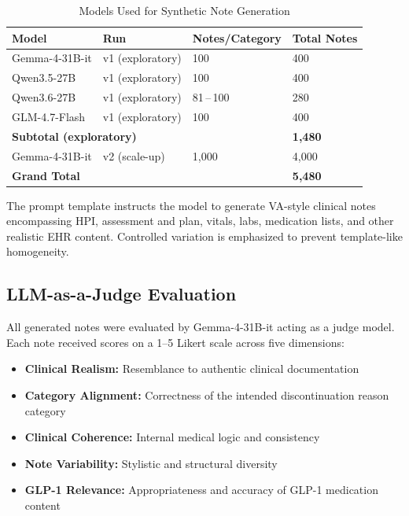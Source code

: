\documentclass[11pt, a4paper]{article}
\begin{document}
\begin{table}[H]
\centering
\caption{Models Used for Synthetic Note Generation}
\label{tab:generation_stats}
\begin{tabular}{llll}
\toprule
\textbf{Model} & \textbf{Run} & \textbf{Notes/Category} & \textbf{Total Notes} \\
\midrule
Gemma-4-31B-it & v1 (exploratory) & 100 & 400 \\
Qwen3.5-27B & v1 (exploratory) & 100 & 400 \\
Qwen3.6-27B & v1 (exploratory) & 81\,--\,100 & 280 \\
GLM-4.7-Flash & v1 (exploratory) & 100 & 400 \\
\midrule
\multicolumn{3}{l}{\textbf{Subtotal (exploratory)}} & \textbf{1,480} \\
\midrule
Gemma-4-31B-it & v2 (scale-up) & 1,000 & 4,000 \\
\midrule
\textbf{Grand Total} & & & \textbf{5,480} \\
\bottomrule
\end{tabular}
\end{table}

The prompt template instructs the model to generate VA-style clinical notes encompassing HPI, assessment and plan, vitals, labs, medication lists, and other realistic EHR content. Controlled variation is emphasized to prevent template-like homogeneity.

\subsection{LLM-as-a-Judge Evaluation}

All generated notes were evaluated by Gemma-4-31B-it acting as a judge model. Each note received scores on a 1--5 Likert scale across five dimensions:

\begin{itemize}
    \item \textbf{Clinical Realism:} Resemblance to authentic clinical documentation
    \item \textbf{Category Alignment:} Correctness of the intended discontinuation reason category
    \item \textbf{Clinical Coherence:} Internal medical logic and consistency
    \item \textbf{Note Variability:} Stylistic and structural diversity
    \item \textbf{GLP-1 Relevance:} Appropriateness and accuracy of GLP-1 medication content
\end{itemize}
\end{document}
